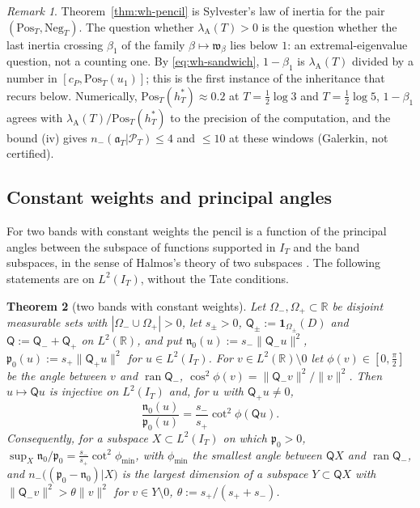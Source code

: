 \documentclass[11pt]{amsart}
\newtheorem{theorem}{Theorem}[section]
\theoremstyle{definition}
\theoremstyle{remark}
\newtheorem{remark}[theorem]{Remark}
\newcommand{\R}{\mathbb R}
\newcommand{\PT}{\mathcal P_T}
\newcommand{\IT}{I_T}
\newcommand{\lamA}{\lambda_{\mathrm A}(T)}
\begin{document}
\begin{remark}\label{rem:wh-pencil}
Theorem~\ref{thm:wh-pencil} is Sylvester's law of inertia for the pair $(\mathrm{Pos}_T,\mathrm{Neg}_T)$. The
question whether $\lamA>0$ is the question whether the last inertia crossing $\beta_1$ of the family
$\beta\mapsto\mathfrak w_\beta$ lies below $1$: an extremal-eigenvalue question, not a counting one. By
\eqref{eq:wh-sandwich}, $1-\beta_1$ is $\lamA$ divided by a number in $[c_P,\mathrm{Pos}_T(u_1)]$; this is the
first instance of the inheritance that recurs below. Numerically, $\mathrm{Pos}_T(h^*_T)\approx0.2$ at
$T=\frac12\log3$ and $T=\frac12\log5$, $1-\beta_1$ agrees with $\lamA/\mathrm{Pos}_T(h^*_T)$ to the precision of the
computation, and the bound (iv) gives $n_-(\mathfrak a_T|\PT)\le4$ and $\le10$ at these windows (Galerkin, not
certified).
\end{remark}

\subsection{Constant weights and principal angles}\label{subsec:wh-angles}

For two bands with constant weights the pencil is a function of the principal angles between the
subspace of functions supported in $\IT$ and the band subspaces, in the sense of Halmos's theory of two
subspaces \cite{Halmos1969}. The following statements are on $L^2(\IT)$, without the Tate conditions.

\begin{theorem}[two bands with constant weights]\label{thm:wh-angles}
Let $\Omega_-,\Omega_+\subset\R$ be disjoint measurable sets with $|\Omega_-\cup\Omega_+|>0$, let $s_\pm>0$,
$\mathsf Q_\pm:=\mathbf 1_{\Omega_\pm}(D)$ and $\mathsf Q:=\mathsf Q_-+\mathsf Q_+$ on $L^2(\R)$, and put
$\mathfrak n_0(u):=s_-\|\mathsf Q_-u\|^2$, $\mathfrak p_0(u):=s_+\|\mathsf Q_+u\|^2$ for $u\in L^2(\IT)$. For
$v\in L^2(\R)\setminus0$ let $\phi(v)\in[0,\frac\pi2]$ be the angle between $v$ and $\operatorname{ran}\mathsf Q_-$,
$\cos^2\phi(v)=\|\mathsf Q_-v\|^2/\|v\|^2$. Then $u\mapsto\mathsf Qu$ is injective on $L^2(\IT)$ and, for $u$ with
$\mathsf Q_+u\ne0$,
\[
\frac{\mathfrak n_0(u)}{\mathfrak p_0(u)}=\frac{s_-}{s_+}\cot^2\phi(\mathsf Qu).
\]
Consequently, for a subspace $X\subset L^2(\IT)$ on which $\mathfrak p_0>0$,
$\sup_X\mathfrak n_0/\mathfrak p_0=\frac{s_-}{s_+}\cot^2\phi_{\min}$, with $\phi_{\min}$ the smallest angle between
$\mathsf QX$ and $\operatorname{ran}\mathsf Q_-$, and $n_-\big((\mathfrak p_0-\mathfrak n_0)|X\big)$ is the largest dimension
of a subspace $Y\subset\mathsf QX$ with $\|\mathsf Q_-v\|^2>\theta\|v\|^2$ for $v\in Y\setminus0$,
$\theta:=s_+/(s_++s_-)$.
\end{theorem}
\end{document}

